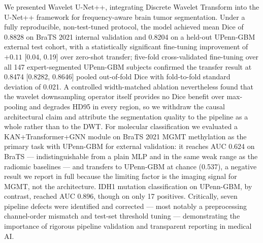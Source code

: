 \documentclass[conference]{IEEEtran}
\begin{document}
We presented Wavelet U-Net++, integrating Discrete Wavelet Transform into the U-Net++ framework for frequency-aware brain tumor segmentation. Under a fully reproducible, non-test-tuned protocol, the model achieved mean Dice of 0.8828 on BraTS 2021 internal validation and 0.8204 on a held-out UPenn-GBM external test cohort, with a statistically significant fine-tuning improvement of $+0.11$ [0.04, 0.19] over zero-shot transfer; five-fold cross-validated fine-tuning over all 147 expert-segmented UPenn-GBM subjects confirmed the transfer result at 0.8474 [0.8282, 0.8646] pooled out-of-fold Dice with fold-to-fold standard deviation of 0.021. A controlled width-matched ablation nevertheless found that the wavelet downsampling operator itself provides no Dice benefit over max-pooling and degrades HD95 in every region, so we withdraw the causal architectural claim and attribute the segmentation quality to the pipeline as a whole rather than to the DWT. For molecular classification we evaluated a KAN+Transformer+GNN module on BraTS 2021 MGMT methylation as the primary task with UPenn-GBM for external validation: it reaches AUC 0.624 on BraTS --- indistinguishable from a plain MLP and in the same weak range as the radiomic baselines --- and transfers to UPenn-GBM at chance (0.537), a negative result we report in full because the limiting factor is the imaging signal for MGMT, not the architecture. IDH1 mutation classification on UPenn-GBM, by contrast, reached AUC 0.896, though on only 17 positives. Critically, seven pipeline defects were identified and corrected --- most notably a preprocessing channel-order mismatch and test-set threshold tuning --- demonstrating the importance of rigorous pipeline validation and transparent reporting in medical AI.
\end{document}
